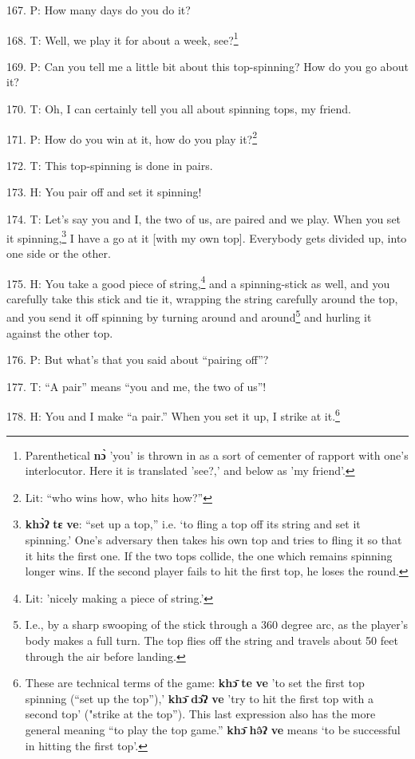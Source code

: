 167. P: How many days do you do it?

168. T: Well, we play it for about a week, see?\footnote{Parenthetical \textbf{nɔ̀} 'you' is thrown in as a sort of cementer of rapport with one's interlocutor. Here it is translated 'see?,' and below as 'my friend'.}

169. P: Can you tell me a little bit about this top-spinning? How do you go about
it?

170. T: Oh, I can certainly tell you all about spinning tops, my friend.

171. P: How do you win at it, how do you play it?\footnote{Lit: ``who wins how, who hits how?''}

172. T: This top-spinning is done in pairs.

173. H: You pair off and set it spinning!

174. T: Let's say you and I, the two of us, are paired and we play. When you set
it spinning,\footnote{\textbf{khɔ̀ʔ} \textbf{tɛ} \textbf{ve}: ``set up a top,'' i.e. `to fling a top off its string and set it spinning.' One's adversary then takes his own top and tries to fling it so that it hits the first one. If the two tops collide, the one which remains spinning longer wins. If the second player fails to hit the first top, he loses the round.} I have a go at it [with my own top]. Everybody gets divided up,
into one side or the other.

175. H: You take a good piece of string,\footnote{Lit: 'nicely making a piece of string.'} and a spinning-stick as well, and you
carefully take this stick and tie it, wrapping the string carefully around the
top, and you send it off spinning by turning around and around\footnote{I.e., by a sharp swooping of the stick through a 360 degree arc, as the player's body makes a full turn. The top flies off the string and travels about 50 feet through the air before landing.} and hurling
it against the other top.

176. P: But what's that you said about ``pairing off''?

177. T: ``A pair'' means ``you and me, the two of us''!

178. H:  You and I make ``a pair.''
When you set it up, I strike at it.\footnote{These are technical terms of the game: \textbf{khɔ̄} \textbf{te} \textbf{ve} 'to set the first top spinning (``set up the top''),' \textbf{khɔ̄} \textbf{dɔ̂ʔ} \textbf{ve} 'try to hit the first top with a second top' ("strike at the top''). This last expression also has the more general meaning ``to play the top game.'' \textbf{khɔ̄} \textbf{hə̂ʔ} \textbf{ve} means `to be successful in hitting the first top'.}

